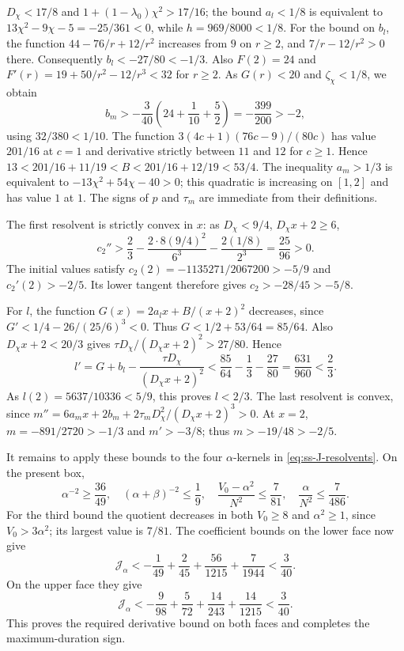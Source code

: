 $D_\chi<17/8$ and $1+(1-\lambda_0)\chi^2>17/16$;
the bound $a_l<1/8$ is equivalent to
$13\chi^2-9\chi-5=-25/361<0$, while $h=969/8000<1/8$.
For the bound on $b_l$, the function $44-76/r+12/r^2$ increases
from $9$ on $r\ge2$, and $7/r-12/r^2>0$ there.
Consequently $b_l<-27/80<-1/3$.
Also $F(2)=24$ and $F'(r)=19+50/r^2-12/r^3<32$ for $r\ge2$.
As $G(r)<20$ and $\zeta_\chi<1/8$, we obtain
\[
 b_m>-\frac3{40}\left(24+\frac1{10}+\frac52\right)
      =-\frac{399}{200}>-2,
\]
using $32/380<1/10$.
The function
$3(4c+1)(76c-9)/(80c)$ has value $201/16$ at $c=1$ and derivative
strictly between $11$ and $12$ for $c\ge1$. Hence
$13<201/16+11/19<B<201/16+12/19<53/4$.
The inequality $a_m>1/3$ is equivalent to
$-13\chi^2+54\chi-40>0$; this quadratic is increasing on $[1,2]$
and has value $1$ at $1$.
The signs of $p$ and $\tau_m$ are immediate from their definitions.

The first resolvent is strictly convex in $x$: as $D_\chi<9/4$, $D_\chi x+2\ge6$,
\[
 c_2''>\frac23-\frac{2\cdot8(9/4)^2}{6^3}
                 -\frac{2(1/8)}{2^3}=\frac{25}{96}>0.
\]
The initial values satisfy $c_2(2)=-1135271/2067200>-5/9$ and
$c_2'(2)>-2/5$. Its lower tangent therefore gives
$c_2>-28/45>-5/8$.

For $l$, the function $G(x)=2a_lx+B/(x+2)^2$ decreases, since
$G'<1/4-26/(25/6)^3<0$. Thus $G<1/2+53/64=85/64$.
Also $D_\chi x+2<20/3$ gives $\tau D_\chi/(D_\chi x+2)^2>27/80$. Hence
\[
 l'=G+b_l-\frac{\tau D_\chi}{(D_\chi x+2)^2}
       <\frac{85}{64}-\frac13-\frac{27}{80}
       =\frac{631}{960}<\frac23.
\]
As $l(2)=5637/10336<5/9$, this proves $l<2/3$.
The last resolvent is convex, since
$m''=6a_mx+2b_m+2\tau_mD_\chi^2/(D_\chi x+2)^3>0$.
At $x=2$, $m=-891/2720>-1/3$ and $m'>-3/8$; thus
$m>-19/48>-2/5$.

It remains to apply these bounds to the four $\alpha$-kernels in
\eqref{eq:ss-J-resolvents}. On the present box,
\[
 \alpha^{-2}\ge\frac{36}{49},\quad
 (\alpha+\beta)^{-2}\le\frac19,\quad
 \frac{V_0-\alpha^2}{N^2}\le\frac7{81},\quad
 \frac\alpha{N^2}\le\frac7{486}.
\]
For the third bound the quotient decreases in both $V_0\ge8$ and
$\alpha^2\ge1$, since $V_0>3\alpha^2$; its largest value is $7/81$.
The coefficient bounds on the lower face now give
\[
 \mathcal J_\alpha< -\frac1{49}+\frac2{45}
                        +\frac{56}{1215}+\frac7{1944}<\frac3{40}.
\]
On the upper face they give
\[
 \mathcal J_\alpha< -\frac9{98}+\frac5{72}
                         +\frac{14}{243}+\frac{14}{1215}<\frac3{40}.
\]
This proves the required derivative bound on both faces and completes the
maximum-duration sign.

